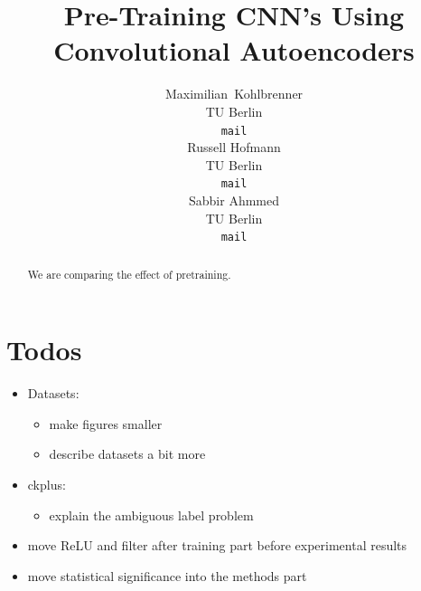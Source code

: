 \documentclass{article}
\title{Pre-Training CNN's Using Convolutional Autoencoders}
\author{
  Maximilian~Kohlbrenner\\
  TU Berlin\\
  \texttt{mail} \\
  \And
  Russell Hofmann\\
  TU Berlin\\
  \texttt{mail} \\
  \AND
  Sabbir Ahmmed \\
  TU Berlin \\
  \texttt{mail}
}
\begin{document}

\maketitle

\begin{abstract}
  We are comparing the effect of pretraining.
\end{abstract}

\section*{Todos}

\begin{itemize}
  \item Datasets:
    \begin{itemize}
      \item make figures smaller
      \item describe datasets a bit more 
    \end{itemize}
  \item ckplus:
    \begin{itemize}
      \item explain the ambiguous label problem 
    \end{itemize}

  \item move ReLU and filter after training part before experimental results
  \item move statistical significance into the methods part 

\end{itemize}
\end{document}
